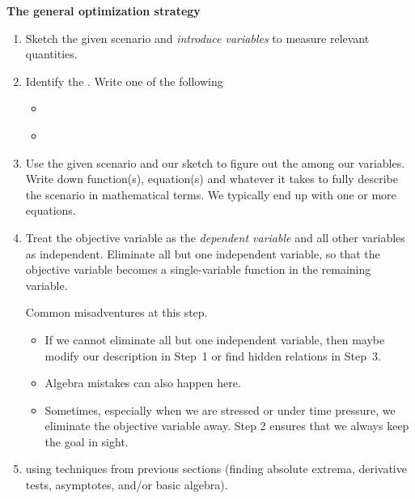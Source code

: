 \documentclass[../main.tex]{subfiles}
\begin{document}
\textbf{The general optimization strategy}
\label{page:optimization-strategy}
\begin{enumerate}[wide, label=(Step~\arabic*).]
  \item Sketch the given scenario and \emph{introduce variables} to measure relevant quantities.

  \item Identify the . Write one of the following
    \begin{itemize}
      \item \emph{}
      \item \emph{}
    \end{itemize}

  \item Use the given scenario and our sketch to figure out the  among our variables. Write down function(s), equation(s) and whatever it takes to fully describe the scenario in mathematical terms. We typically end up with one or more equations.

  \item Treat the objective variable as the \emph{dependent variable} and all other variables as independent. Eliminate all but one independent variable, so that the objective variable becomes a single-variable function in the remaining variable.

    Common misadventures at this step.
    \begin{itemize}
      \item If we cannot eliminate all but one independent variable, then maybe modify our description in Step~1 or find hidden relations in Step~3.
      \item Algebra mistakes can also happen here.
      \item Sometimes, especially when we are stressed or under time pressure, we eliminate the objective variable away. Step 2 ensures that we always keep the goal in sight.
    \end{itemize}

  \item {} using techniques from previous sections (finding absolute extrema, derivative tests, asymptotes, and/or basic algebra).

\end{enumerate}
\clearpage
\end{document}
